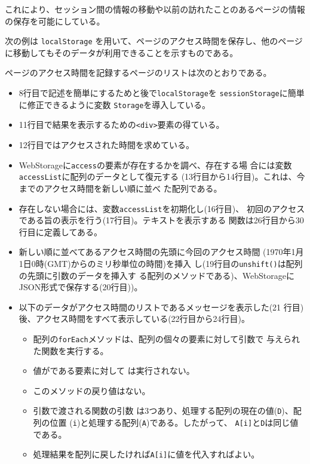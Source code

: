 これにより、セッション間の情報の移動や以前の訪れたことのあるページの情報
の保存を可能にしている。

\begin{Exec}\upshape
次の例は \texttt{localStorage} を用いて、ページのアクセス時間を保存し、他のページ
 に移動してもそのデータが利用できることを示すものである。

ページのアクセス時間を記録するページのリストは次のとおりである。
 \begin{itemize}
	\item 8行目で記述を簡単にするためと後で\texttt{localStorage}を
				\texttt{sessionStorage}に簡単に修正できるように変数
				\texttt{Storage}を導入している。
	\item 11行目で結果を表示するための\texttt{<div>}要素の得ている。
	\item 12行目ではアクセスされた時間を求めている。
	\item WebStorageに\texttt{access}の要素が存在するかを調べ、存在する場
				合には変数\texttt{accessList}に配列のデータとして復元する
				(13行目から14行目)。これは、今までのアクセス時間を新しい順に並べ
				た配列である。
	\item 存在しない場合には、変数\texttt{accessList}を初期化し(16行目)、
				初回のアクセスである旨の表示を行う(17行目)。テキストを表示すある
				関数は26行目から30行目に定義してある。
	\item 新しい順に並べてあるアクセス時間の先頭に今回のアクセス時間
				(1970年1月1日0時(GMT)からのミリ秒単位の時間)を挿入
				し(19行目の\texttt{unshift()}は配列の先頭に引数のデータを挿入す
				る配列のメソッドである)、WebStorageにJSON形式で保存する(20行目))。
	\item 以下のデータがアクセス時間のリストであるメッセージを表示した(21
				行目)後、アクセス時間をすべて表示している(22行目から24行目)。
\begin{itemize}
 \item 配列の\texttt{forEach}メソッドは、配列の個々の要素に対して引数で
			 与えられた関数を実行する。
 \item 値がである要素に対して
			 は実行されない。
 \item このメソッドの戻り値はない。
 \item 引数で渡される関数の引数
				は3つあり、処理する配列の現在の値(\texttt{D})、配列の位置
			 (\texttt{i})と処理する配列(\texttt{A})である。したがって、
			 \texttt{A[i]}と\texttt{D}は同じ値である。
 \item 処理結果を配列に戻したければ\texttt{A[i]}に値を代入すればよい。

\end{itemize}
\end{itemize}
\end{Exec}
